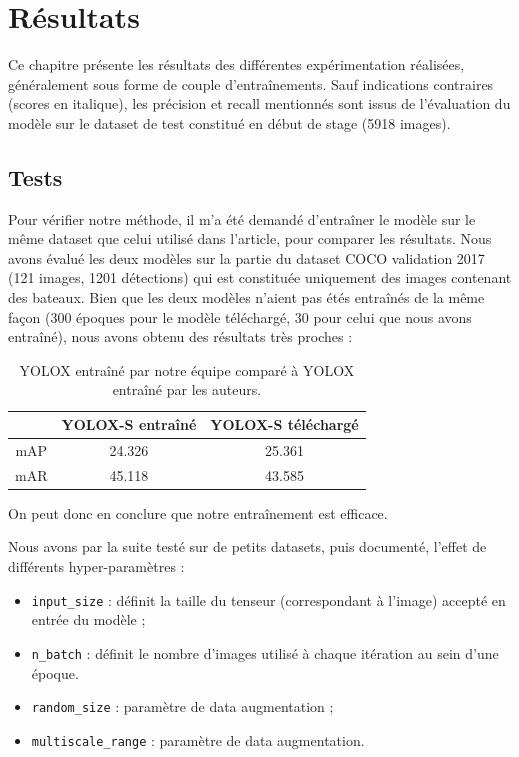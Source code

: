 \chapter{Résultats}\label{resultats}

Ce chapitre présente les résultats des différentes expérimentation réalisées,
généralement sous forme de couple d'entraînements. Sauf indications contraires (scores en italique),
les précision et recall mentionnés sont issus de l'évaluation du modèle sur le
dataset de test constitué en début de stage (5918 images).

\section{Tests}


Pour vérifier notre méthode, il m'a été demandé d'entraîner le modèle sur le même dataset que celui utilisé
dans l'article, pour comparer les résultats. Nous avons évalué les deux modèles sur la partie du dataset
COCO validation 2017 (121 images, 1201 détections) qui est constituée uniquement des images
contenant des bateaux.
Bien que les deux modèles n'aient pas étés entraînés de la même façon (300 époques pour le modèle téléchargé,
30 pour celui que nous avons entraîné), nous avons obtenu des résultats très proches :

\begin{table}[!h]
    \caption{YOLOX entraîné par notre équipe comparé à YOLOX entraîné par les auteurs.}
\begin{center}
    \begin{tabular}{ c c c }
        \hline
        & YOLOX-S entraîné & YOLOX-S téléchargé \\
        \hline
        mAP & 24.326 & 25.361 \\
        mAR & 45.118 & 43.585
    \end{tabular}
\end{center}
\end{table}

On peut donc en conclure que notre entraînement est efficace.

Nous avons par la suite testé sur de petits datasets, puis documenté,
l'effet de différents hyper-paramètres :

\begin{itemize}
    \item \texttt{input\_size} : définit la taille du tenseur (correspondant à l'image) accepté en entrée du modèle ;
    \item \texttt{n\_batch} : définit le nombre d'images utilisé à chaque itération au sein d'une époque.
    \item \texttt{random\_size} : paramètre de data augmentation ;
    \item \texttt{multiscale\_range} : paramètre de data augmentation.
\end{itemize}

